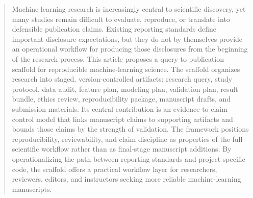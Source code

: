 \begin{abstract}
Machine-learning research is increasingly central to scientific discovery, yet many studies remain difficult to evaluate, reproduce, or translate into defensible publication claims. Existing reporting standards define important disclosure expectations, but they do not by themselves provide an operational workflow for producing those disclosures from the beginning of the research process. This article proposes a query-to-publication scaffold for reproducible machine-learning science. The scaffold organizes research into staged, version-controlled artifacts: research query, study protocol, data audit, feature plan, modeling plan, validation plan, result bundle, ethics review, reproducibility package, manuscript drafts, and submission materials. Its central contribution is an evidence-to-claim control model that links manuscript claims to supporting artifacts and bounds those claims by the strength of validation. The framework positions reproducibility, reviewability, and claim discipline as properties of the full scientific workflow rather than as final-stage manuscript additions. By operationalizing the path between reporting standards and project-specific code, the scaffold offers a practical workflow layer for researchers, reviewers, editors, and instructors seeking more reliable machine-learning manuscripts.
\end{abstract}
